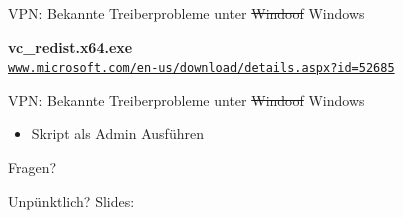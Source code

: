 \documentclass[10pt]{beamer}
\newcommand\urls[1]{%
  \href{https://#1}{\nolinkurl{#1}}%
}
\begin{document}
\begin{frame}{VPN: Bekannte Treiberprobleme unter \protect\sout{Windoof} Windows}
    \begin{figure}
        \centering
    \end{figure}
    \vspace{1em}

    \large
    \textbf{vc\_redist.x64.exe}\\
    \urls{www.microsoft.com/en-us/download/details.aspx?id=52685}
\end{frame}

\begin{frame}{VPN: Bekannte Treiberprobleme unter \protect\sout{Windoof} Windows}
    
    \begin{itemize}
        \item Skript als Admin Ausführen
    \end{itemize}
\end{frame}


\begin{frame}[standout]
  Fragen?
\end{frame}

{

    \begin{frame}[label=unpuenktlich]{Unpünktlich?}
        \centering\Large
        Slides:\\~\\
    \end{frame}
}
\end{document}

